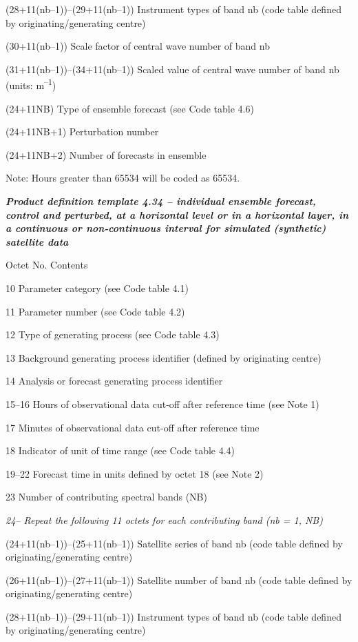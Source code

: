 (28+11(nb--1))--(29+11(nb--1)) Instrument types of band nb (code table defined by originating/generating centre)

(30+11(nb--1)) Scale factor of central wave number of band nb

(31+11(nb--1))--(34+11(nb--1)) Scaled value of central wave number of band nb (units: m\textsuperscript{--1})

(24+11NB) Type of ensemble forecast (see Code table 4.6)

(24+11NB+1) Perturbation number

(24+11NB+2) Number of forecasts in ensemble

Note: Hours greater than 65534 will be coded as 65534.

\emph{\textbf{Product definition template 4.34 -- individual ensemble forecast, control and perturbed, at a horizontal level or in a horizontal layer, in a continuous or non-continuous interval for simulated (synthetic) satellite data}}

Octet No. Contents

10 Parameter category (see Code table 4.1)

11 Parameter number (see Code table 4.2)

12 Type of generating process (see Code table 4.3)

13 Background generating process identifier (defined by originating centre)

14 Analysis or forecast generating process identifier

15--16 Hours of observational data cut-off after reference time (see Note 1)

17 Minutes of observational data cut-off after reference time

18 Indicator of unit of time range (see Code table 4.4)

19--22 Forecast time in units defined by octet 18 (see Note 2)

23 Number of contributing spectral bands (NB)

\emph{24-- Repeat the following 11 octets for each contributing band (nb = 1, NB)}

(24+11(nb--1))--(25+11(nb--1)) Satellite series of band nb (code table defined by originating/generating centre)

(26+11(nb--1))--(27+11(nb--1)) Satellite number of band nb (code table defined by originating/generating centre)

(28+11(nb--1))--(29+11(nb--1)) Instrument types of band nb (code table defined by originating/generating centre)

